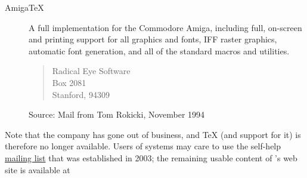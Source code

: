 \begin{description}
\item[Amiga\TeX{}] A full implementation for the Commodore Amiga,
  including full, on-screen and printing support for all \PS{}
  graphics and fonts, IFF raster graphics, automatic font generation,
  and all of the standard macros and utilities.
  \begin{quote}
    Radical Eye Software\\
     Box 2081\\
    Stanford,  94309\\
  \end{quote}
  Source: Mail from Tom Rokicki, November 1994
\end{description}
%
%

Note that the company \YandY{} has gone out of business, and \YandY{}
\TeX{} (and support for it) is therefore no longer available.  Users
of \YandY{} systems may care to use the self-help
\href*{http://tug.org/pipermail/yandytex/}{mailing list}
that was established in 2003; the remaining usable content of
\YandY{}'s web site is available at 

